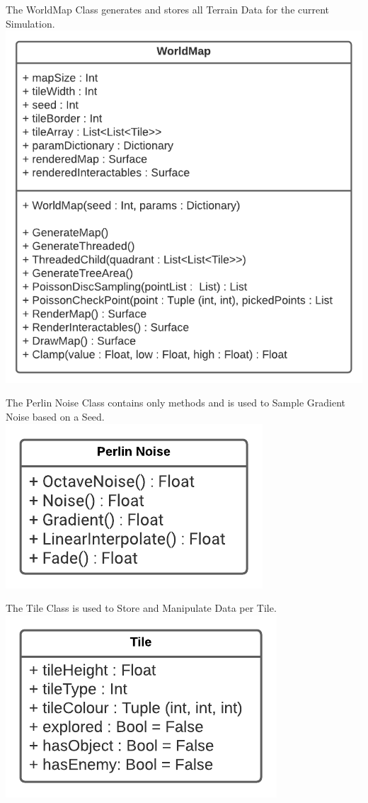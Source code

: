 \begin{flushleft}
\begin{center}
                The WorldMap Class generates and stores all Terrain Data for the current Simulation. \\
                \includegraphics[width=.65\textwidth]{Images/Design/Classes/WorldMap.png} \\
                \vspace{0.2cm}

                The Perlin Noise Class contains only methods and is used to Sample Gradient Noise based on a Seed. \\
                \includegraphics[width=.45\textwidth]{Images/Design/Classes/PerlinNoise.png} \\
                \vspace{0.2cm}

                The Tile Class is used to Store and Manipulate Data per Tile.
                \includegraphics[width=.35\textwidth]{Images/Design/Classes/Tile.png} \\
                \vspace{0.2cm}
                

\end{center}
\end{flushleft}
